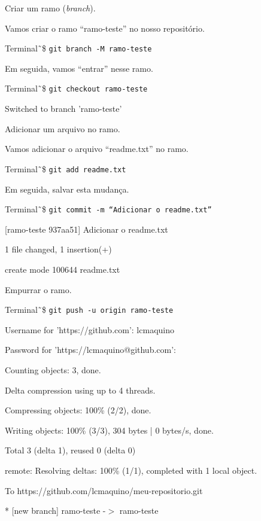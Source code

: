 \documentclass[brazil,aspectratio=169]{beamer}
\newcommand{\terminal}[1]{\textcolor{my-green}{\texttt{#1}}}
\begin{document}
\begin{frame}{Criar um ramo (\textit{branch}).}

  Vamos criar o ramo ``ramo-teste'' no nosso repositório.

  \begin{exampleblock}{Terminal}
    \~\,\$ \terminal{git branch -M ramo-teste}
  \end{exampleblock}

  Em seguida, vamos ``entrar'' nesse ramo.

  \begin{exampleblock}{Terminal}
    \~\,\$ \terminal{git checkout ramo-teste}

    Switched to branch 'ramo-teste'
  \end{exampleblock}
  
\end{frame}

\begin{frame}{Adicionar um arquivo no ramo.}

  Vamos adicionar o arquivo ``readme.txt'' no ramo.

  \begin{exampleblock}{Terminal}
    \~\,\$ \terminal{git add readme.txt}
  \end{exampleblock}

  Em seguida, salvar esta mudança.

  \begin{exampleblock}{Terminal}
    \~\,\$ \terminal{git commit -m ``Adicionar o readme.txt''}

    [ramo-teste 937aa51] Adicionar o readme.txt

    1 file changed, 1 insertion(+)

    create mode 100644 readme.txt
  \end{exampleblock}

\end{frame}


\begin{frame}{Empurrar o ramo.}

  \begin{exampleblock}{Terminal}
    \~\,\$ \terminal{git push -u origin ramo-teste}

    Username for 'https://github.com': lcmaquino

    Password for 'https://lcmaquino@github.com': 

    Counting objects: 3, done.

    Delta compression using up to 4 threads.

    Compressing objects: 100\% (2/2), done.

    Writing objects: 100\% (3/3), 304 bytes | 0 bytes/s, done.

    Total 3 (delta 1), reused 0 (delta 0)

    remote: Resolving deltas: 100\% (1/1), completed with 1 local object.

    To https://github.com/lcmaquino/meu-repositorio.git

    * [new branch] ramo-teste -$>$ ramo-teste
\end{exampleblock}

\end{frame}
\end{document}
